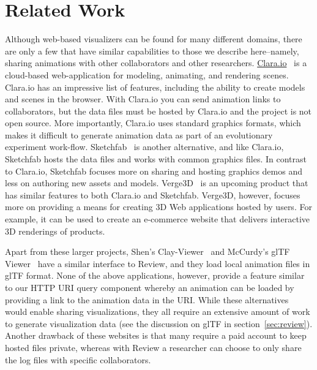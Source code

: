 \section{Related Work}
\label{sec:related_work}

Although web-based visualizers can be found for many different domains, there are only a few that have similar capabilities to those we describe here--namely, sharing animations with other collaborators and other researchers.
%
\url{Clara.io}~\autocite{Clara.2018.SIGGRAPH.Web} is a cloud-based web-application for modeling, animating, and rendering scenes.
%
Clara.io has an impressive list of features, including the ability to create models and scenes in the browser. With Clara.io you can send animation links to collaborators, but the data files must be hosted by Clara.io and the project is not open source.
%
More importantly, Clara.io uses standard graphics formats, which makes it difficult to generate animation data as part of an evolutionary experiment work-flow.
%
Sketchfab~\autocite{Sketchfab.2018.Web} is another alternative, and like Clara.io, Sketchfab hosts the data files and works with common graphics files.
%
In contrast to Clara.io, Sketchfab focuses more on sharing and hosting graphics demos and less on authoring new assets and models.
%
Verge3D~\autocite{Kovelenov.2018.Verge3D} is an upcoming product that has similar features to both Clara.io and Sketchfab. Verge3D, however, focuses more on providing a means for creating 3D Web applications hosted by users. For example, it can be used to create an e-commerce website that delivers interactive 3D renderings of products.


Apart from these larger projects, Shen's Clay-Viewer~\autocite{Shen.2018.ClayViewer} and McCurdy's glTF Viewer~\autocite{McCurdy.2017.glTFViewer} have a similar interface to Review, and they load local animation files in glTF format.
%
None of the above applications, however, provide a feature similar to our HTTP URI query component whereby an animation can be loaded by providing a link to the animation data in the URI.
%
While these alternatives would enable sharing visualizations, they all require an extensive amount of work to generate visualization data (see the discussion on glTF in section~\ref{sec:review}).
%
Another drawback of these websites is that many require a paid account to keep hosted files private, whereas with Review a researcher can choose to only share the log files with specific collaborators.
